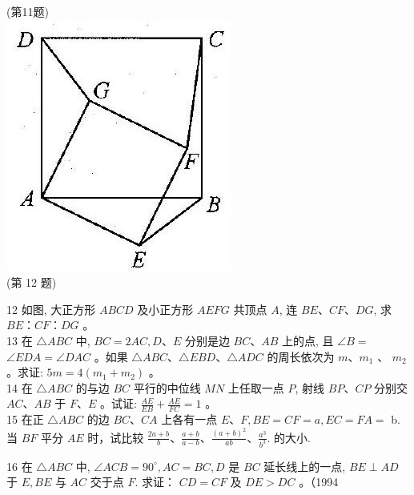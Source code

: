 \documentclass[10pt]{article}
\begin{document}
(第11题)\\
\includegraphics[max width=\textwidth, center]{2024_10_30_2c8f45efd4a519b08e1ag-044}\\
(第 12 题)

12 如图, 大正方形 $A B C D$ 及小正方形 $A E F G$ 共顶点 $A$, 连 $B E 、 C F 、 D G$, 求 $B E ： C F ： D G$ 。\\
13 在 $\triangle A B C$ 中, $B C=2 A C, D 、 E$ 分别是边 $B C 、 A B$ 上的点, 且 $\angle B=$ $\angle E D A=\angle D A C$ 。如果 $\triangle A B C 、 \triangle E B D 、 \triangle A D C$ 的周长依次为 $m 、 m_{1}$ 、 $m_{2}$ 。求证: $5 m=4\left(m_{1}+m_{2}\right)$ 。\\
14 在 $\triangle A B C$ 的与边 $B C$ 平行的中位线 $M N$ 上任取一点 $P$, 射线 $B P 、 C P$ 分别交 $A C 、 A B$ 于 $F 、 E$ 。试证: $\frac{A E}{E B}+\frac{A E}{F C}=1$ 。\\
15 在正 $\triangle A B C$ 的边 $B C 、 C A$ 上各有一点 $E 、 F, B E=C F=a, E C=F A=$ b. 当 $B F$ 平分 $A E$ 时，试比较 $\frac{2 a+b}{b} 、 \frac{a+b}{a-b} 、 \frac{(a+b)^{2}}{a b} 、 \frac{a^{3}}{b^{3}}$. 的大小.

16 在 $\triangle A B C$ 中, $\angle A C B=90^{\circ}, A C=B C, D$ 是 $B C$ 延长线上的一点, $B E \perp A D$ 于 $E, B E$ 与 $A C$ 交于点 $F$. 求证： $C D=C F$ 及 $D E>D C$ 。（1994
\end{document}

